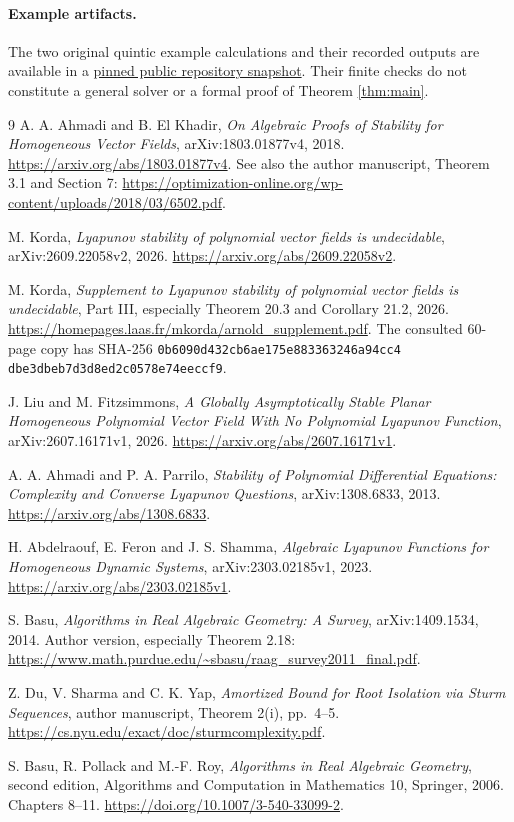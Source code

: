\documentclass[11pt]{article}
\theoremstyle{remark}\newtheorem{remark}[theorem]{Remark}
\begin{document}
\paragraph{Example artifacts.}
The two original quintic example calculations and their recorded outputs are available in a
\href{https://github.com/lluiseriksson/physmath-knowledge-tree/tree/e63b8f6aa88e784d48ede9b16f457402799c2f7a/integrations/research-radar/notes}{pinned public repository snapshot}.
Their finite checks do not constitute a general solver or a formal proof of Theorem \ref{thm:main}.

\begin{thebibliography}{9}
A. A. Ahmadi and B. El Khadir,
\emph{On Algebraic Proofs of Stability for Homogeneous Vector Fields},
arXiv:1803.01877v4, 2018.
\url{https://arxiv.org/abs/1803.01877v4}.
See also the author manuscript, Theorem 3.1 and Section 7:
\url{https://optimization-online.org/wp-content/uploads/2018/03/6502.pdf}.

M. Korda,
\emph{Lyapunov stability of polynomial vector fields is undecidable},
arXiv:2609.22058v2, 2026.
\url{https://arxiv.org/abs/2609.22058v2}.

M. Korda,
\emph{Supplement to Lyapunov stability of polynomial vector fields is undecidable},
Part III, especially Theorem 20.3 and Corollary 21.2, 2026.
\url{https://homepages.laas.fr/mkorda/arnold_supplement.pdf}.
The consulted 60-page copy has SHA-256
\texttt{0b6090d432cb6ae175e883363246a94cc4}\\
\texttt{dbe3dbeb7d3d8ed2c0578e74eeccf9}.

J. Liu and M. Fitzsimmons,
\emph{A Globally Asymptotically Stable Planar Homogeneous Polynomial Vector Field With No Polynomial Lyapunov Function},
arXiv:2607.16171v1, 2026.
\url{https://arxiv.org/abs/2607.16171v1}.

A. A. Ahmadi and P. A. Parrilo,
\emph{Stability of Polynomial Differential Equations: Complexity and Converse Lyapunov Questions},
arXiv:1308.6833, 2013.
\url{https://arxiv.org/abs/1308.6833}.

H. Abdelraouf, E. Feron and J. S. Shamma,
\emph{Algebraic Lyapunov Functions for Homogeneous Dynamic Systems},
arXiv:2303.02185v1, 2023.
\url{https://arxiv.org/abs/2303.02185v1}.

S. Basu,
\emph{Algorithms in Real Algebraic Geometry: A Survey},
arXiv:1409.1534, 2014.
Author version, especially Theorem 2.18:
\url{https://www.math.purdue.edu/~sbasu/raag_survey2011_final.pdf}.

Z. Du, V. Sharma and C. K. Yap,
\emph{Amortized Bound for Root Isolation via Sturm Sequences},
author manuscript, Theorem 2(i), pp.~4--5.
\url{https://cs.nyu.edu/exact/doc/sturmcomplexity.pdf}.

S. Basu, R. Pollack and M.-F. Roy,
\emph{Algorithms in Real Algebraic Geometry}, second edition,
Algorithms and Computation in Mathematics 10, Springer, 2006.
Chapters 8--11.
\url{https://doi.org/10.1007/3-540-33099-2}.
\end{thebibliography}
\end{document}
